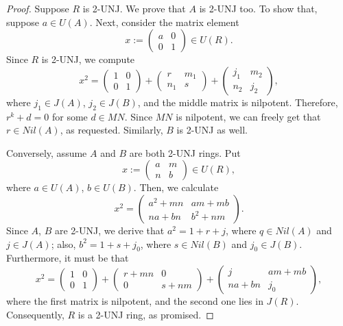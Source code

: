\documentclass[12pt]{amsart}
\theoremstyle{definition}
\begin{document}
\begin{proof}
Suppose $R$ is 2-UNJ. We prove that $A$ is 2-UNJ too. To show that, suppose \( a \in U(A) \). Next, consider the matrix element
\[
x := \begin{pmatrix} a & 0 \\ 0 & 1 \end{pmatrix} \in U(R).
\]
Since \( R \) is 2-UNJ, we compute
\[
x^2 = \begin{pmatrix} 1 & 0 \\ 0 & 1 \end{pmatrix} +
\begin{pmatrix} r & m_1 \\ n_1 & s \end{pmatrix} +
\begin{pmatrix} j_1 & m_2 \\ n_2 & j_2 \end{pmatrix},
\]
where \( j_1 \in J(A) \), \( j_2 \in J(B) \), and the middle matrix is nilpotent. Therefore, \( r^k + d = 0 \) for some \( d \in MN\). Since $MN$ is nilpotent, we can freely get that \( r \in Nil(A) \), as requested. Similarly, \( B \) is 2-UNJ as well.

Conversely, assume \( A \) and \( B \) are both 2-UNJ rings. Put
\[
x := \begin{pmatrix} a & m \\ n & b \end{pmatrix} \in U(R),
\]
where \( a \in U(A) \), \( b \in U(B) \). Then, we calculate
\[
x^2 = \begin{pmatrix}
	a^2 + mn & am + mb \\
	na + bn & b^2 + nm
\end{pmatrix}.
\]
Since \( A \), \( B \) are 2-UNJ, we derive that $a^2 = 1 + r + j$, where $q \in Nil(A)$ and $j \in J(A)$; also, $b^2 = 1 + s + j_0$, where $s\in Nil(B)$ and $j_0 \in J(B)$.
Furthermore, it must be that
\[
x^2 = \begin{pmatrix} 1 & 0 \\ 0 & 1 \end{pmatrix} +
\begin{pmatrix} r + mn & 0 \\ 0 & s + nm \end{pmatrix} +
\begin{pmatrix} j & am + mb \\ na + bn & j_0 \end{pmatrix},
\]
where the first matrix is nilpotent, and the second one lies in \( J(R) \). Consequently, \( R \) is a 2-UNJ ring, as promised.
\end{proof}
\end{document}
